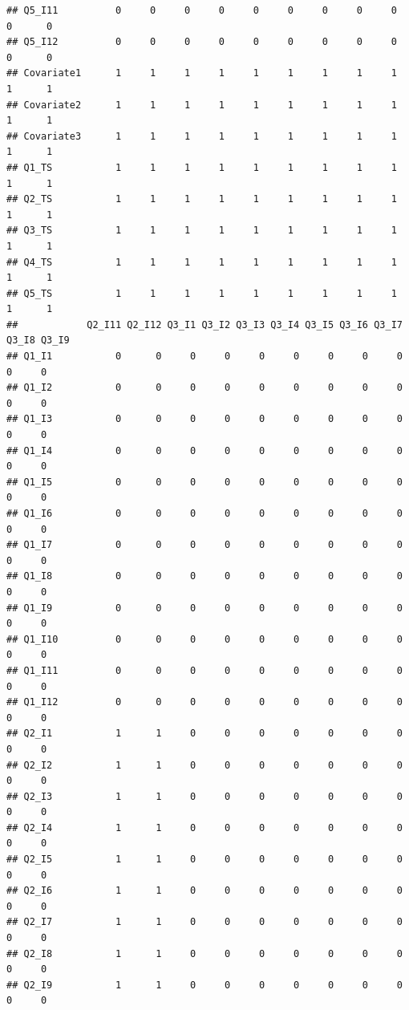 \documentclass[
]{book}
\begin{document}
\begin{verbatim}
## Q5_I11          0     0     0     0     0     0     0     0     0     0      0
## Q5_I12          0     0     0     0     0     0     0     0     0     0      0
## Covariate1      1     1     1     1     1     1     1     1     1     1      1
## Covariate2      1     1     1     1     1     1     1     1     1     1      1
## Covariate3      1     1     1     1     1     1     1     1     1     1      1
## Q1_TS           1     1     1     1     1     1     1     1     1     1      1
## Q2_TS           1     1     1     1     1     1     1     1     1     1      1
## Q3_TS           1     1     1     1     1     1     1     1     1     1      1
## Q4_TS           1     1     1     1     1     1     1     1     1     1      1
## Q5_TS           1     1     1     1     1     1     1     1     1     1      1
##            Q2_I11 Q2_I12 Q3_I1 Q3_I2 Q3_I3 Q3_I4 Q3_I5 Q3_I6 Q3_I7 Q3_I8 Q3_I9
## Q1_I1           0      0     0     0     0     0     0     0     0     0     0
## Q1_I2           0      0     0     0     0     0     0     0     0     0     0
## Q1_I3           0      0     0     0     0     0     0     0     0     0     0
## Q1_I4           0      0     0     0     0     0     0     0     0     0     0
## Q1_I5           0      0     0     0     0     0     0     0     0     0     0
## Q1_I6           0      0     0     0     0     0     0     0     0     0     0
## Q1_I7           0      0     0     0     0     0     0     0     0     0     0
## Q1_I8           0      0     0     0     0     0     0     0     0     0     0
## Q1_I9           0      0     0     0     0     0     0     0     0     0     0
## Q1_I10          0      0     0     0     0     0     0     0     0     0     0
## Q1_I11          0      0     0     0     0     0     0     0     0     0     0
## Q1_I12          0      0     0     0     0     0     0     0     0     0     0
## Q2_I1           1      1     0     0     0     0     0     0     0     0     0
## Q2_I2           1      1     0     0     0     0     0     0     0     0     0
## Q2_I3           1      1     0     0     0     0     0     0     0     0     0
## Q2_I4           1      1     0     0     0     0     0     0     0     0     0
## Q2_I5           1      1     0     0     0     0     0     0     0     0     0
## Q2_I6           1      1     0     0     0     0     0     0     0     0     0
## Q2_I7           1      1     0     0     0     0     0     0     0     0     0
## Q2_I8           1      1     0     0     0     0     0     0     0     0     0
## Q2_I9           1      1     0     0     0     0     0     0     0     0     0

\end{verbatim}
\end{document}
